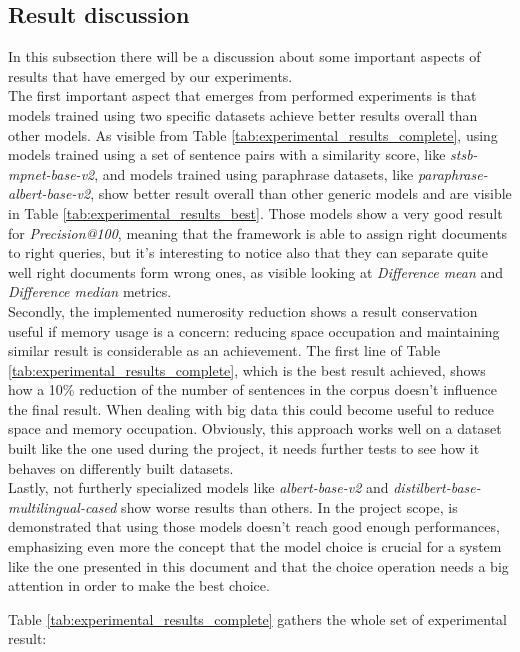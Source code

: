 \documentclass[\main/main.tex]{subfiles}
\begin{document}
\subsection{Result discussion}
In this subsection there will be a discussion about some important aspects of results that have emerged by our experiments. \\
The first important aspect that emerges from performed experiments is that models trained using two specific datasets achieve better results overall than other models. As visible from Table \ref{tab:experimental_results_complete}, using models trained using a set of sentence pairs with a similarity score, like \emph{stsb-mpnet-base-v2}, and models trained using paraphrase datasets, like \emph{paraphrase-albert-base-v2}, show better result overall than other generic models and are visible in Table \ref{tab:experimental_results_best}. Those models show a very good result for \emph{Precision@100}, meaning that the framework is able to assign right documents to right queries, but it's interesting to notice also that they can separate quite well right documents form wrong ones, as visible looking at \emph{Difference mean} and \emph{Difference median} metrics.\\
Secondly, the implemented numerosity reduction shows a result conservation useful if memory usage is a concern: reducing space occupation and maintaining similar result is considerable as an achievement. The first line of Table \ref{tab:experimental_results_complete}, which is the best result achieved, shows how a 10\% reduction of the number of sentences in the corpus doesn't influence the final result. When dealing with big data this could become useful to reduce space and memory occupation. Obviously, this approach works well on a dataset built like the one used during the project, it needs further tests to see how it behaves on differently built datasets.\\
Lastly, not furtherly specialized models like \emph{albert-base-v2} and \emph{distilbert-base-multilingual-cased} show worse results than others. In the project scope, is demonstrated that using those models doesn't reach good enough performances, emphasizing even more the concept that the model choice is crucial for a system like the one presented in this document and that the choice operation needs a big attention in order to make the best choice.

Table \ref{tab:experimental_results_complete} gathers the whole set of experimental result:\\
\end{document}
